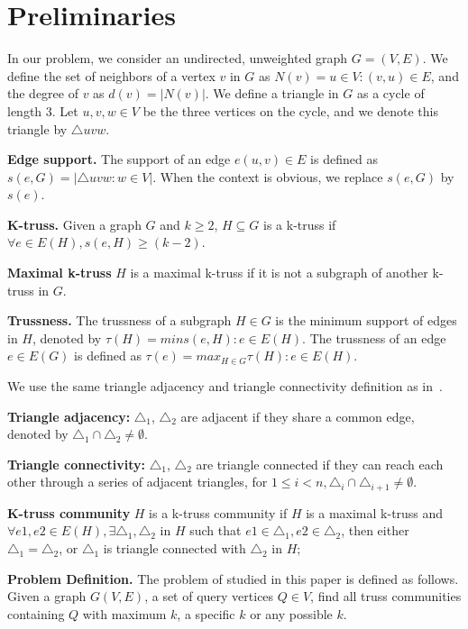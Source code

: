 \section{Preliminaries}
\label{preliminary}

In our problem, we consider an undirected, unweighted graph $G = (V,E)$. We define the set of neighbors of a vertex $v$ in $G$ as $N(v)= {u \in V :(v, u) \in E}$, and the degree of $v$ as $d(v)= |N(v)|$. We define a triangle in $G$ as a cycle of length 3. Let $u, v, w \in V$ be the three vertices on the cycle, and we denote this triangle by $\triangle uvw$.

\textbf{Edge support.} The support of an edge $e(u, v) \in E$ is defined as $s(e,G) = |{\triangle uvw : w \in V}|$. When the context is obvious, we replace $s(e,G)$ by $s(e)$.

\textbf{K-truss.} Given a graph $G$ and $k \ge 2$, $H \subseteq G$ is a k-truss if $\forall e \in E(H), s(e,H) ≥ (k − 2)$. 

\textbf{Maximal k-truss} $H$ is a maximal k-truss if it is not a subgraph of another k-truss in $G$.

\textbf{Trussness.} The trussness of a subgraph $H \in G$ is the minimum support of edges in $H$, denoted by $\tau(H) = min{s(e,H): e \in E(H)}$.  The trussness of an edge $e \in E(G)$ is defined as $\tau(e)=max_{H \in G}{\tau(H): e \in E(H)}$. 

We use the same triangle adjacency and triangle connectivity definition as in~\cite{huang2014querying}.

\textbf{Triangle adjacency:} ${\triangle}_{1}$, ${\triangle}_{2}$ are adjacent if they share a common edge, denoted by ${\triangle}_{1} \cap {\triangle}_{2} \neq \emptyset$. 

\textbf{Triangle connectivity:} ${\triangle}_{1}$, ${\triangle}_{2}$ are triangle connected if they can reach each other through a series of adjacent triangles, \ie for $1 \le i < n, {\triangle}_{i} \cap {\triangle}_{i+1} \neq \emptyset$.

\textbf{K-truss community} $H$ is a k-truss community if $H$ is a maximal k-truss and $\forall e1,e2 \in E(H), \exists {\triangle}_{1}, {\triangle}_{2}$ in $H$ such that $e1 \in {\triangle}_{1}, e2 \in {\triangle}_{2}$, then either ${\triangle}_{1} = {\triangle}_{2}$, or ${\triangle}_{1}$ is triangle connected with ${\triangle}_{2}$ in $H$;

\textbf{Problem Definition.} The problem of studied in this paper is defined as follows. Given a graph $G(V,E)$, a set of query vertices $Q \in V$, find all truss communities containing $Q$ with maximum $k$, a specific $k$ or any possible $k$. 
